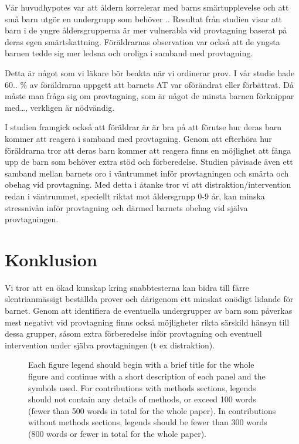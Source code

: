\documentclass[12pt,twocolumn]{article}
\begin{document}
V\r{a}r huvudhypotes var att \r{a}ldern korrelerar med barns sm\"artupplevelse och att sm\r{a}
barn utg\"or en undergrupp som beh\"over ..  Resultat fr\r{a}n studien visar att barn i
de yngre \r{a}ldersgrupperna \"ar mer vulnerabla vid provtagning baserat p\r{a} deras egen
sm\"artskattning. F\"or\"aldrarnas observation var ocks\r{a} att de yngsta barnen tedde
sig mer ledsna och oroliga i samband med provtagning.

Detta \"ar n\r{a}got som vi l\"akare b\"or beakta n\"ar vi ordinerar prov. I v\r{a}r studie hade
60.. \% av f\"or\"aldrarna uppgett att barnets AT var of\"or\"andrat eller f\"orb\"attrat.
D\r{a} m\r{a}ste man fr\r{a}ga sig om provtagning, som \"ar n\r{a}got de minsta barnen
f\"orknippar med…, verkligen \"ar n\"odv\"andig.

I studien framgick ocks\r{a} att f\"or\"aldrar \"ar \"ar bra p\r{a} att f\"orutse hur deras barn
kommer att reagera i samband med provtagning. Genom att efterh\"ora hur
f\"or\"aldrarna tror att deras barn kommer att  reagera finns en m\"ojlighet att f\r{a}nga
upp de barn som beh\"over extra st\"od och f\"orberedelse. Studien p\r{a}visade \"aven ett
samband mellan barnets oro i v\"antrummet inf\"or provtagningen och sm\"arta och
obehag vid provtagning. Med detta i \r{a}tanke tror vi att distraktion/intervention
redan i v\"antrummet, speciellt riktat mot \r{a}ldersgrupp 0-9 \r{a}r, kan minska
stressniv\r{a}n inf\"or provtagning och d\"armed barnets obehag vid sj\"alva
provtagningen.

\section{Konklusion}

Vi tror att en \"okad kunskap kring snabbtesterna kan bidra till f\"arre
slentrianm\"assigt best\"allda prover och d\"arigenom ett minskat on\"odigt lidande f\"or
barnet. Genom att identifiera de eventuella undergrupper av barn som p\r{a}verkas
mest negativt vid provtagning finns ocks\r{a} m\"ojligheter rikta s\"arskild h\"ansyn till
dessa grupper, s\r{a}som extra f\"orberedelse inf\"or provtagning och eventuell
intervention under sj\"alva provtagningen (t ex distraktion).


\begin{figure}
\caption{Each figure legend should begin with a brief title for
the whole figure and continue with a short description of each
panel and the symbols used. For contributions with methods
sections, legends should not contain any details of methods, or
exceed 100 words (fewer than 500 words in total for the whole
paper). In contributions without methods sections, legends should
be fewer than 300 words (800 words or fewer in total for the whole
paper).}
\end{figure}
\end{document}
